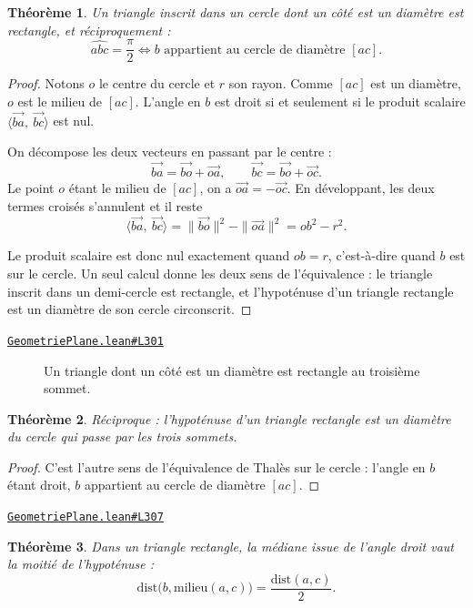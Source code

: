 \documentclass[11pt,a4paper]{article}
\theoremstyle{definition}
\theoremstyle{plain}
\newtheorem{theoreme}{Théorème}
\newcommand{\source}[2]{\par\smallskip\noindent\hfill{\footnotesize\href{#1}{\texttt{#2}}}\par\smallskip}
\begin{document}
\begin{theoreme}
Un triangle inscrit dans un cercle dont un côté est un diamètre est rectangle, et
réciproquement :
\[ \widehat{abc} = \frac{\pi}{2} \iff b \text{ appartient au cercle de diamètre } [ac] . \]
\end{theoreme}

\begin{proof}
Notons $o$ le centre du cercle et $r$ son rayon. Comme $[ac]$ est un diamètre, $o$ est le
milieu de $[ac]$. L'angle en $b$ est droit si et seulement si le produit scalaire
$\langle \vec{ba},\ \vec{bc}\rangle$ est nul.

On décompose les deux vecteurs en passant par le centre :
\[ \vec{ba} = \vec{bo} + \vec{oa} , \qquad \vec{bc} = \vec{bo} + \vec{oc} . \]
Le point $o$ étant le milieu de $[ac]$, on a $\vec{oa} = -\vec{oc}$. En développant, les
deux termes croisés s'annulent et il reste
\[ \langle \vec{ba},\ \vec{bc}\rangle = \|\vec{bo}\|^2 - \|\vec{oa}\|^2 = ob^2 - r^2 . \]

Le produit scalaire est donc nul exactement quand $ob = r$, c'est-à-dire quand $b$ est sur
le cercle. Un seul calcul donne les deux sens de l'équivalence : le triangle inscrit dans un
demi-cercle est rectangle, et l'hypoténuse d'un triangle rectangle est un diamètre de son
cercle circonscrit.
\end{proof}
\source{https://github.com/Commutator-IO/learn-lean/blob/main/courses/01-college/02-geometrie-plane/GeometriePlane.lean\#L301}{GeometriePlane.lean\#L301}

\begin{figure}[h]
\centering

\caption{Un triangle dont un côté est un diamètre est rectangle au troisième sommet.}
\end{figure}

\begin{theoreme}
Réciproque : l'hypoténuse d'un triangle rectangle est un diamètre du cercle qui passe
par les trois sommets.
\end{theoreme}

\begin{proof}
C'est l'autre sens de l'équivalence de Thalès sur le cercle : l'angle en $b$ étant
droit, $b$ appartient au cercle de diamètre $[ac]$.
\end{proof}
\source{https://github.com/Commutator-IO/learn-lean/blob/main/courses/01-college/02-geometrie-plane/GeometriePlane.lean\#L307}{GeometriePlane.lean\#L307}

\begin{theoreme}
Dans un triangle rectangle, la médiane issue de l'angle droit vaut la moitié de
l'hypoténuse :
\[ \mathrm{dist}\bigl(b, \text{milieu}(a,c)\bigr) = \frac{\mathrm{dist}(a,c)}{2} . \]
\end{theoreme}
\end{document}
